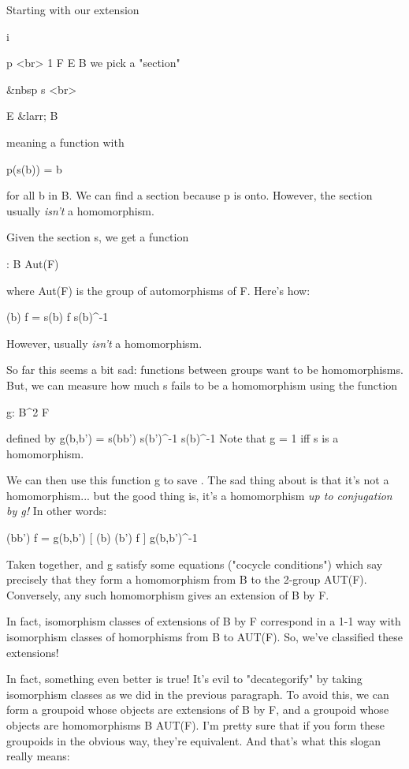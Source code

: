 Starting with our extension

              
 i    
      
 p  <br>
1 \to  F \to  E \to  B 
we pick a "section"

              
      &nbsp
                s  <br>
                
            E &larr; B

meaning a function with 

p(s(b)) = b

for all b in B.  We can find a section because p is onto.  However,
the section usually \emph{isn't} a homomorphism.

Given the section s, we get a function 

\alpha : B \to  Aut(F)

where Aut(F) is the group of automorphisms of F.  Here's how:

\alpha (b) f = s(b) f s(b)^{-1}

However, usually \alpha  \emph{isn't} a homomorphism.  

So far this seems a bit sad: functions between groups want
to be homomorphisms.
But, we can measure how much s fails to be a homomorphism 
using the function

g: B^{2} \to  F

defined by
g(b,b') = s(bb') s(b')^{-1} s(b)^{-1}
Note that g = 1 iff s is a homomorphism.  

We can then use this
function g to save \alpha .  The sad thing about \alpha  is that
it's not a homomorphism... but the good thing is, it's a homomorphism
\emph{up to conjugation by g!}  In other words:

\alpha (bb') f = g(b,b') [ \alpha (b) \alpha (b') f ] g(b,b')^{-1}

Taken together, \alpha  and g satisfy some equations ("cocycle
conditions") which say precisely that they form
a homomorphism from B to the 2-group AUT(F).  Conversely, 
any such homomorphism gives an extension of B by F.  

In fact, isomorphism classes of extensions of B by F correspond
in a 1-1 way with isomorphism classes of homorphisms from B to AUT(F).
So, we've classified these extensions!
 
In fact, something even better is true!  
It's evil to "decategorify" by 
taking isomorphism classes as we did in the previous paragraph.  To avoid 
this, we can form a groupoid whose objects are extensions of B by F, and a 
groupoid whose objects are homomorphisms B \to  AUT(F).  I'm pretty sure
that if you form these groupoids in the obvious way, they're equivalent.  
And that's what this slogan really means:

